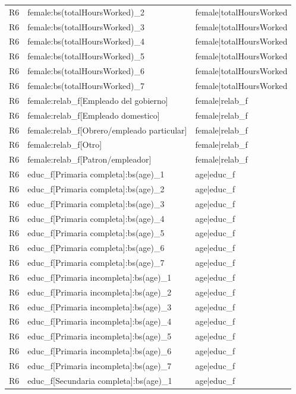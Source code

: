 \begin{longtable}{lll}
R6 & female:bs(totalHoursWorked)\_2 & female|totalHoursWorked \\
R6 & female:bs(totalHoursWorked)\_3 & female|totalHoursWorked \\
R6 & female:bs(totalHoursWorked)\_4 & female|totalHoursWorked \\
R6 & female:bs(totalHoursWorked)\_5 & female|totalHoursWorked \\
R6 & female:bs(totalHoursWorked)\_6 & female|totalHoursWorked \\
R6 & female:bs(totalHoursWorked)\_7 & female|totalHoursWorked \\
R6 & female:relab\_f[Empleado del gobierno] & female|relab\_f \\
R6 & female:relab\_f[Empleado domestico] & female|relab\_f \\
R6 & female:relab\_f[Obrero/empleado particular] & female|relab\_f \\
R6 & female:relab\_f[Otro] & female|relab\_f \\
R6 & female:relab\_f[Patron/empleador] & female|relab\_f \\
R6 & educ\_f[Primaria completa]:bs(age)\_1 & age|educ\_f \\
R6 & educ\_f[Primaria completa]:bs(age)\_2 & age|educ\_f \\
R6 & educ\_f[Primaria completa]:bs(age)\_3 & age|educ\_f \\
R6 & educ\_f[Primaria completa]:bs(age)\_4 & age|educ\_f \\
R6 & educ\_f[Primaria completa]:bs(age)\_5 & age|educ\_f \\
R6 & educ\_f[Primaria completa]:bs(age)\_6 & age|educ\_f \\
R6 & educ\_f[Primaria completa]:bs(age)\_7 & age|educ\_f \\
R6 & educ\_f[Primaria incompleta]:bs(age)\_1 & age|educ\_f \\
R6 & educ\_f[Primaria incompleta]:bs(age)\_2 & age|educ\_f \\
R6 & educ\_f[Primaria incompleta]:bs(age)\_3 & age|educ\_f \\
R6 & educ\_f[Primaria incompleta]:bs(age)\_4 & age|educ\_f \\
R6 & educ\_f[Primaria incompleta]:bs(age)\_5 & age|educ\_f \\
R6 & educ\_f[Primaria incompleta]:bs(age)\_6 & age|educ\_f \\
R6 & educ\_f[Primaria incompleta]:bs(age)\_7 & age|educ\_f \\
R6 & educ\_f[Secundaria completa]:bs(age)\_1 & age|educ\_f \\

\end{longtable}
